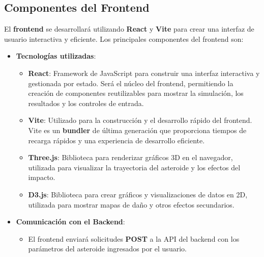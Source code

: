 \documentclass[conference]{IEEEtran}
\begin{document}
\subsection{Componentes del Frontend}
El \textbf{frontend} se desarrollará utilizando \textbf{React} y \textbf{Vite}
para crear una interfaz de usuario interactiva y eficiente. Los principales
componentes del frontend son:
\begin{itemize}
	\item \textbf{Tecnologías utilizadas}:
	      \begin{itemize}
		      \item \textbf{React}: Framework de JavaScript para construir una
		            interfaz interactiva y gestionada por estado. Será el núcleo del
		            frontend, permitiendo la creación de componentes reutilizables para
		            mostrar la simulación, los resultados y los controles de entrada.
		      \item \textbf{Vite}: Utilizado para la construcción y el desarrollo
		            rápido del frontend. Vite es un \textbf{bundler} de última generación que
		            proporciona tiempos de recarga rápidos y una experiencia de
		            desarrollo eficiente.
		      \item \textbf{Three.js}: Biblioteca para renderizar gráficos 3D en el
		            navegador, utilizada para visualizar la trayectoria del asteroide
		            y los efectos del impacto.
		      \item \textbf{D3.js}: Biblioteca para crear gráficos y visualizaciones
		            de datos en 2D, utilizada para mostrar mapas de daño y otros
		            efectos secundarios.
	      \end{itemize}
	\item \textbf{Comunicación con el Backend}:
	      \begin{itemize}
		      \item El frontend enviará solicitudes \textbf{POST} a la API del backend
		            con los parámetros del asteroide ingresados por el usuario.
	      \end{itemize}
\end{itemize}
\end{document}
